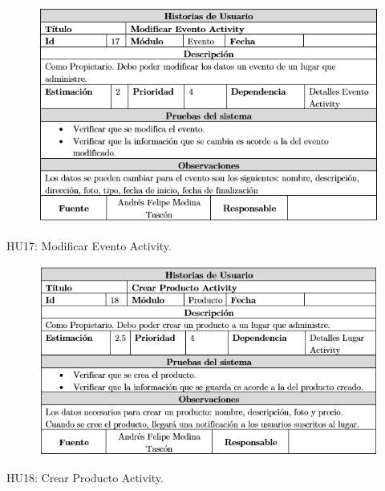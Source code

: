 \documentclass[12pt,letterpaper,openany]{book}
\begin{document}
\begin{table}[H]
\begin{center}
\begin{figure}[H]
\begin{center}
\includegraphics[width=13cm]{./imagenes/HU/HU17}
\end{center}
\end{figure}
\end{center}
\caption{HU17: Modificar Evento Activity.}
\end{table}

\begin{table}[H]
\begin{center}
\begin{figure}[H]
\begin{center}
\includegraphics[width=13cm]{./imagenes/HU/HU18}
\end{center}
\end{figure}
\end{center}
\caption{HU18: Crear Producto Activity.}
\end{table}
\end{document}
